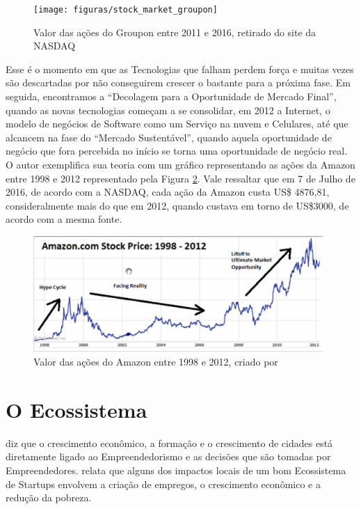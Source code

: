 \begin{figure}[!htb]
\centering
\texttt{[image: figuras/stock\_market\_groupon]}
\caption{Valor das ações do Groupon entre 2011 e 2016, retirado do site da NASDAQ}
\label{figure:stock_market_groupon}
\end{figure}

Esse é o momento em que as Tecnologias que falham perdem força e muitas vezes são descartadas por não conseguirem crescer o bastante para a próxima fase. Em seguida, encontramos a ``Decolagem para a Oportunidade de Mercado Final'', quando as novas tecnologias começam a se consolidar, em 2012 a Internet, o modelo de negócios de Software como um Serviço na nuvem e Celulares, até que alcancem na fase do ``Mercado Sustentável'', quando aquela oportunidade de negócio que fora percebida no início se torna uma oportunidade de negócio real. O autor exemplifica sua teoria com um gráfico representando as ações da Amazon entre 1998 e 2012 representado pela Figura \ref{figure:stock_market_amazon}. Vale ressaltar que em 7 de Julho de 2016, de acordo com a NASDAQ, cada ação da Amazon custa US\$ 4876,81, consideralmente mais do que em 2012, quando custava em torno de US\$3000, de acordo com a mesma fonte.

\begin{figure}[!htb]
\centering
\includegraphics[width=11cm,angle=0]{figuras/stock_market_amazon}
\caption{Valor das ações do Amazon entre 1998 e 2012, criado por \cite{Pepper2012}}
\label{figure:stock_market_amazon}
\end{figure}

\section{O Ecossistema}
\label{section:ecossistemas_e_suas_pecas}

 diz que o crescimento econômico, a formação e o crescimento de cidades está diretamente ligado ao Empreendedorismo e as decisões que são tomadas por Empreendedores.  relata que alguns dos impactos locais de um bom Ecossistema de Startups envolvem a criação de empregos, o crescimento econômico e a redução da pobreza. 

